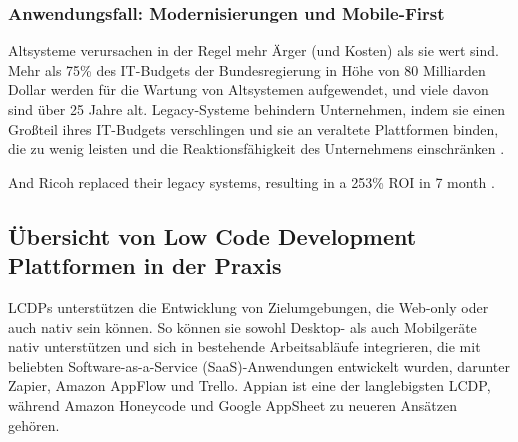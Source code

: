 \documentclass[12pt]{article} %
\begin{document}
	\subsubsection{Anwendungsfall: Modernisierungen und Mobile-First}	
	Altsysteme verursachen in der Regel mehr Ärger (und Kosten) als sie wert sind. Mehr als 75\% des IT-Budgets der Bundesregierung in Höhe von 80 Milliarden Dollar werden für die Wartung von Altsystemen aufgewendet, und viele davon sind über 25 Jahre alt. Legacy-Systeme behindern Unternehmen, indem sie einen Großteil ihres IT-Budgets verschlingen und sie an veraltete Plattformen binden, die zu wenig leisten und die Reaktionsfähigkeit des Unternehmens einschränken \autocite{KevinShuler.2023}.
	
	
	And Ricoh replaced their legacy systems, resulting in a 253\% ROI in 7 month \autocite{KevinShuler.2023}.
	
	
	
	
	\subsection{Übersicht von Low Code Development Plattformen in der Praxis}	
	LCDPs unterstützen die Entwicklung von Zielumgebungen, die Web-only oder auch nativ sein können. So können sie sowohl Desktop- als auch Mobilgeräte nativ unterstützen und sich in bestehende Arbeitsabläufe integrieren, die mit beliebten Software-as-a-Service (SaaS)-Anwendungen entwickelt wurden, darunter Zapier, Amazon AppFlow und Trello. Appian ist eine der langlebigsten LCDP, während Amazon Honeycode und Google AppSheet zu neueren Ansätzen gehören. \autocite{DiRuscio.2022}
	
\end{document}

